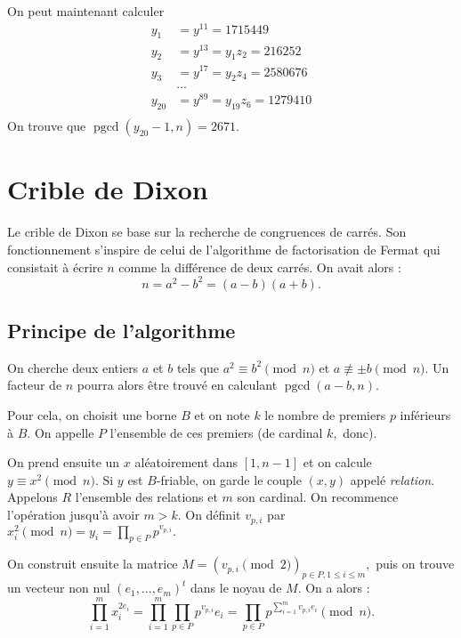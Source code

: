 \documentclass[french, 12pt, titlepage]{article}
\DeclareMathOperator{\pgcd}{pgcd}
\begin{document}
On peut maintenant calculer
\begin{align*}
  y_1 &= y^{11} = 1715449\\
  y_2 &= y^{13} = y_1 z_2 = 216252\\
  y_3 &= y^{17} = y_2 z_4 = 2580676\\
  & ... \\
  y_{20} &= y^{89} = y_{19} z_6 = 1279410\\
\end{align*}
On trouve que $ \pgcd (y_{20} - 1, n) = 2671.$





\section{Crible de Dixon}

Le crible de Dixon se base sur la recherche de congruences de
carrés. Son fonctionnement s'inspire de celui de l'algorithme de
factorisation de Fermat qui consistait à écrire $n$ comme la
différence de deux carrés. On avait alors : \[n = a^2 - b^2 = (a - b)(a + b).\]

\subsection{Principe de l'algorithme}

On cherche deux entiers $a$ et $b$ tels que $a^2 \equiv b^2 \pmod n$ et $a \nequiv \pm{b} \pmod n.$ Un facteur de $n$ pourra alors être trouvé en calculant
$\pgcd(a - b, n).$

Pour cela, on choisit une borne $B$ et on note $k$ le nombre de
premiers $p$ inférieurs à $B.$ On appelle $P$ l'ensemble de ces
premiers (de cardinal $k,$ donc).

On prend ensuite un $x$ aléatoirement dans $[1, n - 1]$ et
on calcule $y \equiv x^2 \pmod n.$ Si $y$ est $B$-friable, on garde le
couple $(x, y)$ appelé \textit{relation}. Appelons $R$ l'ensemble des
relations et $m$ son cardinal. On recommence l'opération jusqu'à
avoir $m > k.$ On définit $v_{p, i}$ par $x_i^2 \pmod n = y_i = \prod\limits_{p \in P} p^{v_{p, i}}.$

On construit ensuite la matrice $M = (v_{p, i} \pmod 2)_{p \in P, 1
  \leq i \leq m},$ puis on trouve un vecteur non nul $(e_1, ..., e_m)^t$
dans le noyau de $M.$
On a alors : \[\prod\limits_{i=1}^m x_i^{2e_i} = \prod\limits_{i=1}^m \prod\limits_{p \in P} p^{v_{p, i}}e_i = \prod\limits_{p \in P} p^{\sum\limits_{i=1}^m v_{p, i}e_i} \pmod n.\]
\end{document}
